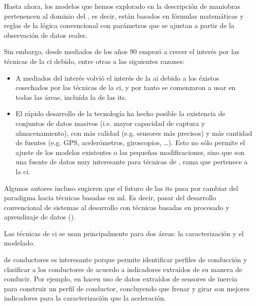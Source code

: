 Hasta ahora, los modelos que hemos explorado en la descripción de maniobras pertenencen al dominio del  , es decir, están basados en fórmulas matemáticas y reglas de la lógica convencional con parámetros que se ajustan a partir de la observación de datos reales.

Sin embargo, desde mediados de los años $90$ empezó a crecer el interés por las técnicas de la \gls{ci} debido, entre otras a las siguientes razones:

\begin{itemize}
	\item A mediados del interés volvió el interés de la \gls{ai} debido a los éxistos cosechados por las técnicas de la \gls{ci}, y por tanto se comenzaron a usar en todas las áreas, incluída la de las its.
	\item El rápido desarrollo de la tecnología ha hecho posible la existencia de conjuntos de datos masivos (i.e. mayor capacidad de captura y almacenamiento), con más calidad (e.g. sensores más precisos) y más cantidad de fuentes (e.g. GPS, acelerómetros, giroscopios, \ldots). Esto no sólo permite el ajuste de los modelos existentes o las pequeñas modificaciones, sino que son una fuente de datos muy interesante para técnicas de , rama que pertenece a la \gls{ci}.
\end{itemize}

Algunos autores incluso sugieren que el futuro de las \gls{its} pasa por cambiar del paradigma hacia técnicas basadas en \gls{ml}. Es decir, pasar del desarrollo convencional de sistemas al desarrollo con técnicas basadas en procesado y aprendizaje de datos (\cite{Zhang2011}).

Las técnicas de \gls{ci} se usan principalmente para dos áreas: la caracterización y el modelado.

 de conductores es interesante porque permite identificar perfiles de conducción y clasificar a los conductores de acuerdo a indicadores extraídos de su manera de conducir. Por ejemplo, en \cite{van2013driver} hacen uso de datos extraídos de sensores de inercia para construir un perfil de conductor, concluyendo que frenar y girar son mejores indicadores para la caracterización que la aceleración.

